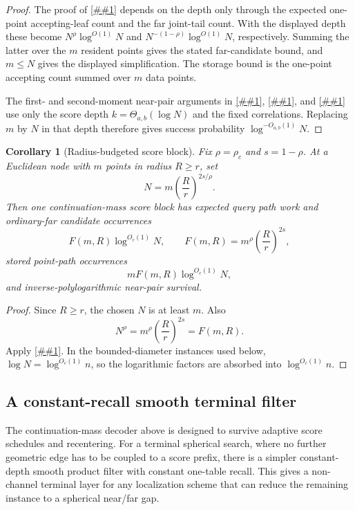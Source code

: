 \documentclass[10pt]{article}
\newcommand{\cref}[1]{\ref{##1}}
\newtheorem{corollary}[theorem]{Corollary}
\theoremstyle{definition}
\begin{document}
\begin{proof}
   The proof of \cref{lem:continuation-work} depends on the depth only through the expected one-point accepting-leaf count and the far joint-tail count. With the displayed depth these become $N^\rho\log^{O(1)}N$ and $N^{-(1-\rho)}\log^{O(1)}N$, respectively. Summing the latter over the $m$ resident points gives the stated far-candidate bound, and $m\le N$ gives the displayed simplification. The storage bound is the one-point accepting count summed over $m$ data points.

   The first- and second-moment near-pair arguments in \cref{lem:good-first-moment}, \cref{lem:tame-second-moment}, and \cref{cor:spherical-survival} use only the score depth $k=\Theta_{a,b}(\log N)$ and the fixed correlations. Replacing $m$ by $N$ in that depth therefore gives success probability $\log^{-O_{a,b}(1)}N$.
\end{proof}

\begin{corollary}[Radius-budgeted score block]\label{cor:radius-budgeted-block}
   Fix $\rho=\rho_c$ and $s=1-\rho$. At a Euclidean node with $m$ points in radius $R\ge r$, set
   \[
      N=m\left(\frac Rr\right)^{2s/\rho}.
   \]
   Then one continuation-mass score block has expected query path work and ordinary-far candidate occurrences
   \[
      F(m,R)\log^{O_c(1)}N,
      \qquad
      F(m,R)=m^\rho\left(\frac Rr\right)^{2s},
   \]
   stored point-path occurrences
   \[
      mF(m,R)\log^{O_c(1)}N,
   \]
   and inverse-polylogarithmic near-pair survival.
\end{corollary}

\begin{proof}
   Since $R\ge r$, the chosen $N$ is at least $m$. Also
   \[
      N^\rho=m^\rho\left(\frac Rr\right)^{2s}=F(m,R).
   \]
   Apply \cref{cor:budgeted-block}. In the bounded-diameter instances used below, $\log N=\log^{O_c(1)}n$, so the logarithmic factors are absorbed into $\log^{O_c(1)}n$.
\end{proof}

\subsection{A constant-recall smooth terminal filter}

The continuation-mass decoder above is designed to survive adaptive score schedules and recentering. For a terminal spherical search, where no further geometric edge has to be coupled to a score prefix, there is a simpler constant-depth smooth product filter with constant one-table recall. This gives a non-channel terminal layer for any localization scheme that can reduce the remaining instance to a spherical near/far gap.
\end{document}
